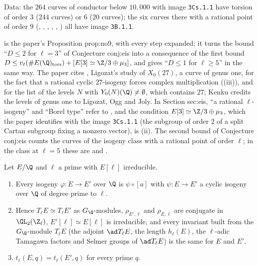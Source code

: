 \noindent Data: the $264$ curves of conductor below $10{,}000$ with image \texttt{3Cs.1.1} have torsion of order $3$ ($244$ curves) or $6$ ($20$ curves); the six curves there with a rational point of
order $9$ (, , , , , ) all have image \texttt{3B.1.1}.

\begin{paperlink}\label{pl:ellcurves:eis}
 is the paper's Proposition prop:no9, with every step expanded; it turns the bound ``$D\le2$ for $\ell=3$'' of Conjecture conj:eis into a consequence of the first bound
$D\le v_\ell(\#E(\Q)_{\mathrm{tors}})+[E[3]\simeq\Z/3\oplus\mu_3]$, and gives ``$D\le1$ for $\ell\ge5$'' in the same way. The paper cites \cite{Ligozat75}, Ligozat's study of $X_0(27)$, a curve of genus one, for the fact that a rational cyclic
$27$-isogeny forces complex multiplication ((iii)), and \cite[Theorem 1]{Kenku} for the list of the levels $N$ with $Y_0(N)(\Q)\ne\emptyset$, which contains $27$;
Kenku credits the levels of genus one to Ligozat, Ogg and Joly. In Section sec:eis, ``a rational $\ell$-isogeny'' and ``Borel type'' refer to ,
and the condition $E[3]\simeq\Z/3\oplus\mu_3$, which the paper identifies with the image \texttt{3Cs.1.1} (the subgroup of order $2$ of a split Cartan subgroup fixing a nonzero vector), is
(ii).
The second bound of Conjecture conj:eis counts the curves of the isogeny class with a rational point of order $\ell$; in the class  at $\ell=5$ these are  and .
\end{paperlink}

\begin{lemma}\label{lem:ellcurves:primetol}
Let $E/\Q$ and $\ell$ a prime with $E[\ell]$ irreducible.
\begin{enumerate}[label=(\roman*)]
\item Every isogeny $\varphi\colon E\to E'$ over $\Q$ is $\psi\circ[a]$ with $\psi\colon E\to E'$ a cyclic isogeny over $\Q$ of degree prime to $\ell$.
\item Hence $T_\ell E\simeq T_\ell E'$ as $G_\Q$-modules, $\rho_{E',\ell}$ and $\rho_{E,\ell}$ are conjugate in $\GL_2(\Z_\ell)$, $E'[\ell]\simeq E[\ell]$ is irreducible, and every invariant built from the
$G_\Q$-module $T_\ell E$ (the adjoint $\ad T_\ell E$, the length $h_\ell(E)$, the $\ell$-adic Tamagawa factors and Selmer groups of $\ad T_\ell E$) is the same for $E$ and $E'$.
\item $t_\ell(E,q)=t_\ell(E',q)$ for every prime $q$.
\end{enumerate}
\end{lemma}

